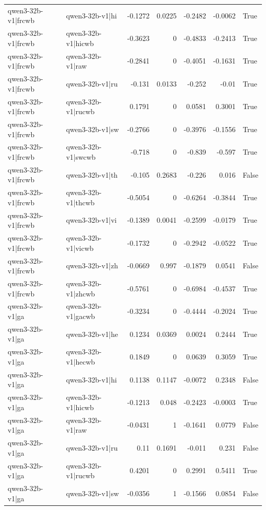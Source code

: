 \begin{table}
\begin{tabular}{l l r r r r l}
qwen3-32b-v1|frcwb & qwen3-32b-v1|hi & -0.1272 & 0.0225 & -0.2482 & -0.0062 & True \\
qwen3-32b-v1|frcwb & qwen3-32b-v1|hicwb & -0.3623 & 0 & -0.4833 & -0.2413 & True \\
qwen3-32b-v1|frcwb & qwen3-32b-v1|raw & -0.2841 & 0 & -0.4051 & -0.1631 & True \\
qwen3-32b-v1|frcwb & qwen3-32b-v1|ru & -0.131 & 0.0133 & -0.252 & -0.01 & True \\
qwen3-32b-v1|frcwb & qwen3-32b-v1|rucwb & 0.1791 & 0 & 0.0581 & 0.3001 & True \\
qwen3-32b-v1|frcwb & qwen3-32b-v1|sw & -0.2766 & 0 & -0.3976 & -0.1556 & True \\
qwen3-32b-v1|frcwb & qwen3-32b-v1|swcwb & -0.718 & 0 & -0.839 & -0.597 & True \\
qwen3-32b-v1|frcwb & qwen3-32b-v1|th & -0.105 & 0.2683 & -0.226 & 0.016 & False \\
qwen3-32b-v1|frcwb & qwen3-32b-v1|thcwb & -0.5054 & 0 & -0.6264 & -0.3844 & True \\
qwen3-32b-v1|frcwb & qwen3-32b-v1|vi & -0.1389 & 0.0041 & -0.2599 & -0.0179 & True \\
qwen3-32b-v1|frcwb & qwen3-32b-v1|vicwb & -0.1732 & 0 & -0.2942 & -0.0522 & True \\
qwen3-32b-v1|frcwb & qwen3-32b-v1|zh & -0.0669 & 0.997 & -0.1879 & 0.0541 & False \\
qwen3-32b-v1|frcwb & qwen3-32b-v1|zhcwb & -0.5761 & 0 & -0.6984 & -0.4537 & True \\
qwen3-32b-v1|ga & qwen3-32b-v1|gacwb & -0.3234 & 0 & -0.4444 & -0.2024 & True \\
qwen3-32b-v1|ga & qwen3-32b-v1|he & 0.1234 & 0.0369 & 0.0024 & 0.2444 & True \\
qwen3-32b-v1|ga & qwen3-32b-v1|hecwb & 0.1849 & 0 & 0.0639 & 0.3059 & True \\
qwen3-32b-v1|ga & qwen3-32b-v1|hi & 0.1138 & 0.1147 & -0.0072 & 0.2348 & False \\
qwen3-32b-v1|ga & qwen3-32b-v1|hicwb & -0.1213 & 0.048 & -0.2423 & -0.0003 & True \\
qwen3-32b-v1|ga & qwen3-32b-v1|raw & -0.0431 & 1 & -0.1641 & 0.0779 & False \\
qwen3-32b-v1|ga & qwen3-32b-v1|ru & 0.11 & 0.1691 & -0.011 & 0.231 & False \\
qwen3-32b-v1|ga & qwen3-32b-v1|rucwb & 0.4201 & 0 & 0.2991 & 0.5411 & True \\
qwen3-32b-v1|ga & qwen3-32b-v1|sw & -0.0356 & 1 & -0.1566 & 0.0854 & False \\

\end{tabular}
\end{table}
